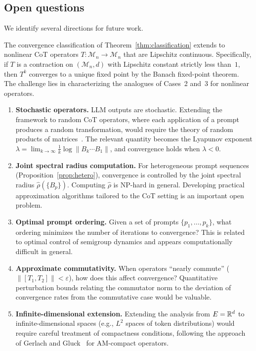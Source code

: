 \subsection{Open questions}

We identify several directions for future work.

\begin{conjecture}\label{conj:nonlinear}
  The convergence classification of Theorem~\ref{thm:classification} extends
  to nonlinear CoT operators $T\colon\mathcal{M}_n\to\mathcal{M}_n$ that are
  Lipschitz continuous. Specifically, if $T$ is a contraction on
  $(\mathcal{M}_n,d)$ with Lipschitz constant strictly less than~$1$, then
  $T^k$ converges to a unique fixed point by the Banach fixed-point theorem.
  The challenge lies in characterizing the analogues of Cases~2 and~3 for
  nonlinear operators.
\end{conjecture}

\begin{enumerate}[label=(\arabic*)]
  \item \textbf{Stochastic operators.} LLM outputs are stochastic. Extending
    the framework to random CoT operators, where each application of a prompt
    produces a random transformation, would require the theory of random
    products of matrices~\cite{Berger1992}. The relevant quantity becomes the
    Lyapunov exponent $\lambda=\lim_{k\to\infty}\frac{1}{k}
    \log\|B_k\cdots B_1\|$, and convergence holds when $\lambda<0$.

  \item \textbf{Joint spectral radius computation.} For heterogeneous prompt
    sequences (Proposition~\ref{prop:hetero}), convergence is controlled by
    the joint spectral radius $\hat\rho(\{B_p\})$. Computing $\hat\rho$ is
    NP-hard in general. Developing practical approximation algorithms
    tailored to the CoT setting is an important open problem.

  \item \textbf{Optimal prompt ordering.} Given a set of prompts
    $\{p_1,\dots,p_k\}$, what ordering minimizes the number of iterations to
    convergence? This is related to optimal control of semigroup dynamics and
    appears computationally difficult in general.

  \item \textbf{Approximate commutativity.} When operators ``nearly commute''
    ($\|[T_1,T_2]\|<\varepsilon$), how does this affect convergence?
    Quantitative perturbation bounds relating the commutator norm to the
    deviation of convergence rates from the commutative case would be
    valuable.

  \item \textbf{Infinite-dimensional extension.} Extending the analysis from
    $E=\mathbb{R}^d$ to infinite-dimensional spaces (e.g., $L^2$ spaces of token
    distributions) would require careful treatment of compactness conditions,
    following the approach of Gerlach and Gluck~\cite{Gerlach2017} for
    AM-compact operators.
\end{enumerate}

